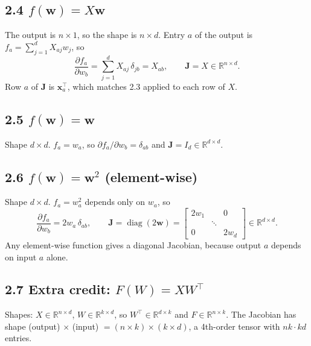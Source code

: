 \documentclass[11pt]{article}
\newcommand{\R}{\mathbb{R}}
\DeclareMathOperator{\diag}{diag}
\begin{document}
\subsection*{2.4 $f(\mathbf{w}) = X\mathbf{w}$}
The output is $n\times 1$, so the shape is $n\times d$. Entry $a$ of the output is $f_a = \sum_{j=1}^d X_{aj}w_j$, so
\[
\frac{\partial f_a}{\partial w_b} = \sum_{j=1}^d X_{aj}\,\delta_{jb} = X_{ab}, \qquad \mathbf{J} = X\in\R^{n\times d}.
\]
Row $a$ of $\mathbf{J}$ is $\mathbf{x}_a^\top$, which matches 2.3 applied to each row of $X$.

\subsection*{2.5 $f(\mathbf{w}) = \mathbf{w}$}
Shape $d\times d$. $f_a = w_a$, so $\partial f_a/\partial w_b = \delta_{ab}$ and $\mathbf{J} = I_d\in\R^{d\times d}$.

\subsection*{2.6 $f(\mathbf{w}) = \mathbf{w}^2$ (element-wise)}
Shape $d\times d$. $f_a = w_a^2$ depends only on $w_a$, so
\[
\frac{\partial f_a}{\partial w_b} = 2w_a\,\delta_{ab}, \qquad
\mathbf{J} = \diag(2\mathbf{w}) = \begin{bmatrix} 2w_1 & & 0\\ & \ddots & \\ 0 & & 2w_d\end{bmatrix}\in\R^{d\times d}.
\]
Any element-wise function gives a diagonal Jacobian, because output $a$ depends on input $a$ alone.

\subsection*{2.7 Extra credit: $F(W) = XW^\top$}
Shapes: $X\in\R^{n\times d}$, $W\in\R^{k\times d}$, so $W^\top\in\R^{d\times k}$ and $F\in\R^{n\times k}$. The Jacobian has shape (output) $\times$ (input) $= (n\times k)\times(k\times d)$, a 4th-order tensor with $nk\cdot kd$ entries.
\end{document}
